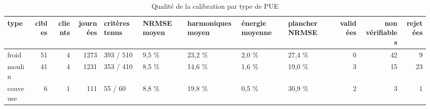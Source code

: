 \begin{table}[htbp]
\caption{Qualité de la calibration par type de PUE}
\label{tab:type_qualite}
\begin{tabular}{lrrrlllllrrr}
\toprule
type & cibles & clients & journées & critères tenus & NRMSE moyen & harmoniques moyen & énergie moyenne & plancher NRMSE & validées & non vérifiables & rejetées \\
\midrule
froid & 51 & 4 & 1273 & 393 / 510 & 9,5 \% & 23,2 \% & 2,0 \% & 27,4 \% & 0 & 42 & 9 \\
moulin & 41 & 4 & 1231 & 353 / 410 & 8,5 \% & 14,6 \% & 1,6 \% & 19,0 \% & 3 & 15 & 23 \\
couveuse & 6 & 1 & 111 & 55 / 60 & 8,8 \% & 19,8 \% & 0,5 \% & 30,9 \% & 2 & 3 & 1 \\
\bottomrule
\end{tabular}
\end{table}
